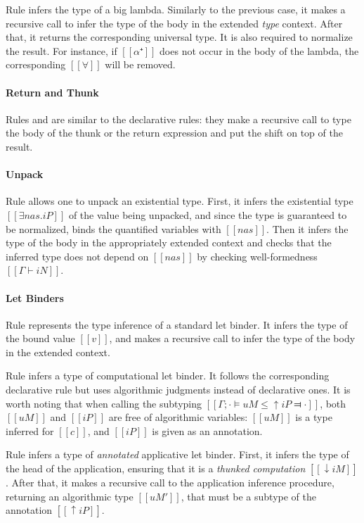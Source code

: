   Rule  infers the type of a big lambda.
  Similarly to the previous case, it makes a recursive call to infer the type
  of the body in the extended \emph{type} context. 
  After that, it returns the corresponding universal type. 
  It is also required to normalize the result.  
  For instance, if $[[α⁺]]$ does not occur in the body of the lambda,
  the corresponding $[[∀]]$ will be removed.

\paragraph{Return and Thunk}
  Rules  and 
  are similar to the declarative rules: they make a recursive call
  to type the body of the thunk or the return expression and
  put the shift on top of the result.

\paragraph{Unpack}
  Rule 
  allows one to unpack an existential type.
  First, it infers the existential type $[[∃nas.iP]]$ of the value being unpacked,
  and since the type is guaranteed to be normalized, binds 
  the quantified variables with $[[nas]]$.
  Then it infers the type of the body in the appropriately extended context
  and checks that the inferred type does not depend on $[[nas]]$
  by checking well-formedness $[[Γ ⊢ iN]]$.

\paragraph{Let Binders}
  Rule  represents the type inference of a
  standard let binder. It infers the type of the bound value $[[v]]$, and makes
  a recursive call to infer the type of the body in the extended context.

  Rule  infers a type of computational let
  binder. It follows the corresponding declarative rule
   but uses algorithmic judgments instead of
  declarative ones. It is worth noting that when calling the subtyping 
  $[[Γ ; · ⊨ uM ≤ ↑iP ⫤ ·]]$, both $[[uM]]$ and $[[iP]]$ are free of algorithmic
  variables: $[[uM]]$ is a type inferred for $[[c]]$, and $[[iP]]$ is given as
  an annotation.

  Rule 
  infers a type of \emph{annotated} applicative let binder.
  First, it infers the type of the head of the application,
  ensuring that it is a \emph{thunked computation} $[[↓iM]]$.
  After that, it makes a recursive call
  to the application inference procedure,
  returning an algorithmic type $[[uM']]$, 
  that must be a subtype of the annotation $[[↑iP]]$.

